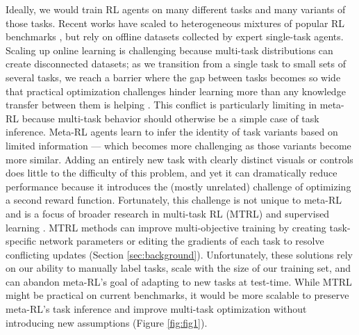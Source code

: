 \documentclass{article}
\begin{document}
Ideally, we would train RL agents on many different tasks and many variants of those tasks. Recent works have scaled to heterogeneous mixtures of popular RL benchmarks \cite{reed2022a, hansen2023td, gallouedec2024jack}, but rely on offline datasets collected by expert single-task agents. Scaling up online learning is challenging because multi-task distributions can create disconnected datasets; as we transition from a single task to small sets of several tasks, we reach a barrier where the gap between tasks becomes so wide that practical optimization challenges hinder learning more than any knowledge transfer between them is helping \cite{taiga2023investigating, shaham2023causes, xin2022current}. This conflict is particularly limiting in meta-RL because multi-task behavior should otherwise be a simple case of task inference. Meta-RL agents learn to infer the identity of task variants based on limited information --- which becomes more challenging as those variants become more similar. Adding an entirely new task with clearly distinct visuals or controls does little to the difficulty of this problem, and yet it can dramatically reduce performance because it introduces the (mostly unrelated) challenge of optimizing a second reward function. Fortunately, this challenge is not unique to meta-RL and is a focus of broader research in multi-task RL (MTRL) and supervised learning \cite{zhang2021survey}. MTRL methods can improve multi-objective training by creating task-specific network parameters or editing the gradients of each task to resolve conflicting updates (Section \ref{sec:background}). Unfortunately, these solutions rely on our ability to manually label tasks, scale with the size of our training set, and can abandon meta-RL's goal of adapting to new tasks at test-time. While MTRL might be practical on current benchmarks, it would be more scalable to preserve meta-RL's task inference and improve multi-task optimization without introducing new assumptions (Figure \ref{fig:fig1}).
\end{document}
